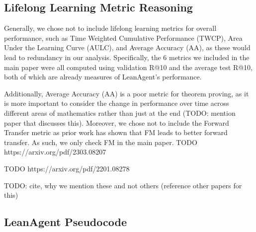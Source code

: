 \documentclass{article} %
\begin{document}
\subsection{Lifelong Learning Metric Reasoning}

Generally, we chose not to include lifelong learning metrics for overall performance, such as Time Weighted Cumulative Performance (TWCP), Area Under the Learning Curve (AULC), and Average Accuracy (AA), as these would lead to redundancy in our analysis. Specifically, the 6 metrics we included in the main paper were all computed using validation R@10 and the average test R@10, both of which are already measures of LeanAgent's performance.

Additionally, Average Accuracy (AA) is a poor metric for theorem proving, as it is more important to consider the change in performance over time across different areas of mathematics rather than just at the end (TODO: mention paper that discusses this). Moreover, we chose not to include the Forward Transfer metric as prior work has shown that FM leads to better forward transfer. As such, we only check FM in the main paper. TODO https://arxiv.org/pdf/2303.08207 

TODO https://arxiv.org/pdf/2201.08278 

TODO: cite, why we mention these and not others (reference other papers for this)


\subsection{LeanAgent Pseudocode}
\end{document}
